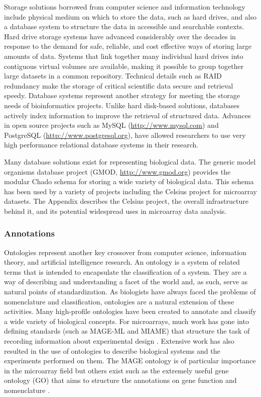{%
Storage solutions borrowed from computer science and information technology
include physical medium on which to store the data, such as hard drives, and also a
database system to structure the data in accessible and searchable contexts.
Hard drive storage systems have advanced considerably over the decades in
response to the demand for safe, reliable, and cost effective ways of storing
large amounts of data.  Systems that link together many individual hard drives
into contiguous virtual volumes are available, making it possible to group
together large datasets in a common repository.  Technical details such as RAID
redundancy make the storage of critical scientific data secure and retrieval
speedy.  Database systems represent another strategy for meeting the storage
needs of bioinformatics projects.  Unlike hard disk-based solutions, databases
actively index information to improve the retrieval of structured data.
Advances in open source projects such as MySQL (\url{http://www.mysql.com}) and
PostgreSQL (\url{http://www.postgresql.org}), have allowed researchers to use
very high performance relational database systems in their research.

Many database solutions exist for representing biological data.  The generic
model organisms database project (GMOD, \url{http://www.gmod.org}) provides the
modular Chado schema for storing a wide variety of biological data.  This
schema has been used by a variety of projects including the Celsius project for
microarray datasets.  The Appendix describes the Celsius project,
the overall infrastructure behind it, and its potential widespread uses in
microarray data analysis.

\subsubsection{Annotations}

Ontologies represent another key crossover from computer science, information
theory, and artificial intelligence research.  An ontology is a system of
related terms that is intended to encapsulate the classification of a system.
They are a way of describing and understanding a facet of the world and, as such,
serve as natural points of standardization.  As biologists have always faced
the problems of nomenclature and classification, ontologies are a natural
extension of these activities.  Many high-profile ontologies have been created
to annotate and classify a wide variety of biological concepts.  For
microarrays, much work has gone into defining standards (such as MAGE-ML and
MIAME) that structure the task of recording information about experimental
design \cite{brazma2001mim}. Extensive work has also resulted in the use of
ontologies to describe biological systems and the experiments performed on
them.  The MAGE ontology is of particular importance in the microarray field
but others exist such as the extremely useful gene ontology (GO) that aims to
structure the annotations on gene function and nomenclature
\cite{stoeckert2003mof,ashburner2000got}.

}
